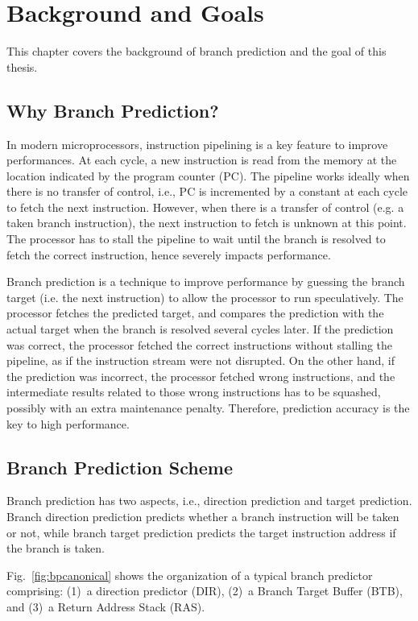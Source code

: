 \chapter{Background and Goals}
\label{chap:background}
This chapter covers the background of branch prediction and the goal of this thesis. 

\section{Why Branch Prediction?}
\label{sec:background:whybp}
In modern microprocessors, instruction pipelining is a key feature to improve performances. At each cycle, a new instruction is read from the memory at the location indicated by the program counter (PC). The pipeline works ideally when there is no transfer of control, i.e., PC is incremented by a constant at each cycle to fetch the next instruction. However, when there is a transfer of control (e.g. a taken branch instruction), the next instruction to fetch is unknown at this point. The processor has to stall the pipeline to wait until the branch is resolved to fetch the correct instruction, hence severely impacts performance.

Branch prediction is a technique to improve performance by guessing the branch target (i.e. the next instruction) to allow the processor to run speculatively. The processor fetches the predicted target, and compares the prediction with the actual target when the branch is resolved several cycles later. If the prediction was correct, the processor fetched the correct instructions without stalling the pipeline, as if the instruction stream were not disrupted. On the other hand, if the prediction was incorrect, the processor fetched wrong instructions, and the intermediate results related to those wrong instructions has to be squashed, possibly with an extra maintenance penalty. Therefore, prediction accuracy is the key to high performance.

\section{Branch Prediction Scheme}
\label{sec:background:bpscheme}
Branch prediction has two aspects, i.e., direction prediction and target prediction. Branch direction prediction predicts whether a branch instruction will be taken or not, while branch target prediction predicts the target instruction address if the branch is taken.

Fig.~\ref{fig:bpcanonical} shows the organization of a typical branch predictor comprising: (1)~a direction predictor (DIR), (2)~a Branch Target Buffer (BTB), and (3)~a Return Address Stack (RAS).  

